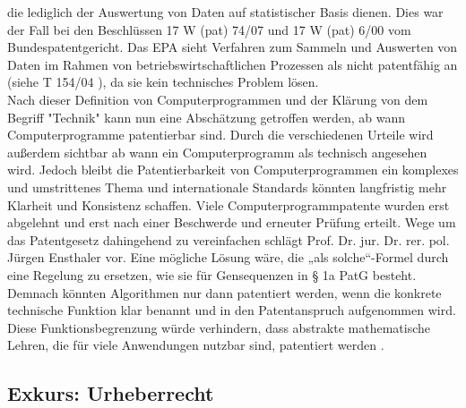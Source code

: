 die lediglich der Auswertung von Daten auf statistischer Basis dienen.
Dies war der Fall bei den Beschlüssen 17 W (pat) 74/07\cite{BPatG10012012}
und 17 W (pat) 6/00 \cite{BPatG01032001} vom Bundespatentgericht.
Das EPA sieht Verfahren zum Sammeln und Auswerten von Daten 
im Rahmen von betriebswirtschaftlichen Prozessen als nicht patentfähig an 
(siehe T 154/04 \cite{EuropaischesPatentamt152006}),
da sie kein technisches Problem lösen.
\\
Nach dieser Definition von Computerprogrammen und der Klärung von dem Begriff
"Technik" kann nun eine Abschätzung getroffen werden, 
ab wann Computerprogramme patentierbar sind. 
Durch die verschiedenen Urteile wird außerdem sichtbar 
ab wann ein Computerprogramm als technisch angesehen wird.
Jedoch bleibt die Patentierbarkeit von Computerprogrammen 
ein komplexes und umstrittenes Thema 
und internationale Standards könnten 
langfristig mehr Klarheit und Konsistenz schaffen.
Viele Computerprogrammpatente wurden erst abgelehnt und erst nach 
einer Beschwerde und erneuter Prüfung erteilt.
Wege um das Patentgesetz dahingehend zu vereinfachen schlägt 
Prof. Dr. jur. Dr. rer. pol. Jürgen Ensthaler vor. 
Eine mögliche Lösung wäre, die „als solche“-Formel durch eine Regelung zu ersetzen, 
wie sie für Gensequenzen in § 1a PatG besteht. 
Demnach könnten Algorithmen nur dann patentiert werden, 
wenn die konkrete technische Funktion klar benannt 
und in den Patentanspruch aufgenommen wird. 
Diese Funktionsbegrenzung würde verhindern, 
dass abstrakte mathematische Lehren, 
die für viele Anwendungen nutzbar sind, patentiert werden 
\cite{ensthalerEnsthalerBegrenzungPatentierung2013}. 
\subsection{Exkurs: Urheberrecht\label{sec:urh}}






